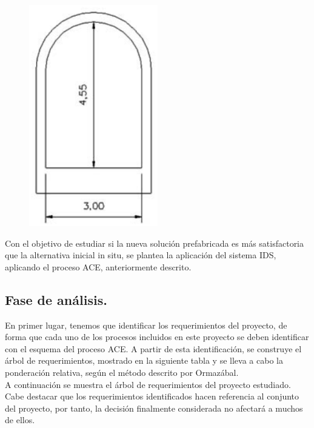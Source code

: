 \documentclass[10pt]{article}
\begin{document}
\begin{figure}[H]
	\begin{center}
 		\includegraphics[width = 0.5\textwidth]{Imagenes/img2.eps}
	\end{center} 
\end{figure}

Con el objetivo de estudiar si la nueva solución prefabricada es más satisfactoria que la alternativa inicial in situ, se plantea la aplicación del sistema IDS, aplicando el proceso ACE, anteriormente descrito.

\subsection{Fase de análisis.}

En primer lugar, tenemos que identificar los requerimientos del proyecto, de forma que cada uno de los procesos incluidos en este proyecto se deben identificar con el esquema del proceso ACE. A partir de esta identificación, se construye el árbol de requerimientos, mostrado en la siguiente tabla y se lleva a cabo la ponderación relativa, según el método descrito por Ormazábal.\\

A continuación se muestra el árbol de requerimientos del proyecto estudiado. Cabe destacar que los requerimientos identificados hacen referencia al conjunto del proyecto, por tanto, la decisión finalmente considerada no afectará a muchos de ellos.\\
\end{document}
